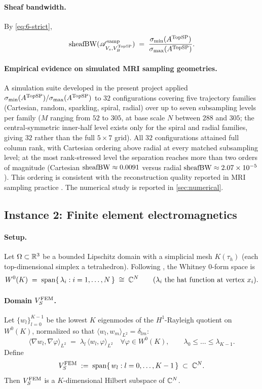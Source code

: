 \paragraph{Sheaf bandwidth.}
By \cref{eq:6-strict},
\[
  \operatorname{sheafBW}(\mathscr{A}^{\mathrm{samp}}_{V_s, V_B^{\mathrm{TopSP}}})
  \;=\;
  \frac{\sigma_{\min}(A^{\mathrm{TopSP}})}{\sigma_{\max}(A^{\mathrm{TopSP}})}.
\]

\paragraph{Empirical evidence on simulated MRI sampling geometries.}
A simulation suite developed in the present project applied
$\sigma_{\min}(A^{\mathrm{TopSP}})/\sigma_{\max}(A^{\mathrm{TopSP}})$ to $32$
configurations covering five trajectory families (Cartesian, random,
sparkling, spiral, radial) over up to seven subsampling levels per
family ($M$ ranging from $52$ to $305$, at base scale $N$ between
$288$ and $305$; the central-symmetric inner-half level exists only
for the spiral and radial families, giving $32$ rather than the full
$5 \times 7$ grid). All $32$ configurations attained full column rank,
with Cartesian ordering above radial at every matched subsampling
level; at the most rank-stressed level the separation reaches more
than two orders of magnitude (Cartesian $\operatorname{sheafBW} \approx 0.0091$
versus radial $\operatorname{sheafBW} \approx 2.07 \times 10^{-5}$). This ordering is
consistent with the reconstruction quality reported in MRI sampling
practice \cite{LustigDonohoPauly2007,LazarusEtAl2019Sparkling}. The
numerical study is reported in \cref{sec:numerical}.

\subsection{Instance 2: Finite element electromagnetics}\label{subsec:6-femem}

\paragraph{Setup.}
Let $\Omega \subset \mathbb{R}^3$ be a bounded Lipschitz domain with a
simplicial mesh $K(\tau_h)$ (each top-dimensional simplex a
tetrahedron). Following \cite{Whitney1957,Bossavit1988}, the Whitney
$0$-form space is
\[
  W^0(K)
  \;=\;
  \operatorname{span}\{\, \lambda_i : i = 1, \dots, N \,\}
  \;\cong\; \mathbb{C}^N
  \qquad
  (\lambda_i \text{ the hat function at vertex } x_i).
\]

\paragraph{Domain $V_S^{\mathrm{FEM}}$.}
Let $\{w_l\}_{l=0}^{K-1}$ be the lowest $K$ eigenmodes of the
$H^1$-Rayleigh quotient on $W^0(K)$, normalized so that
$\langle w_l, w_m \rangle_{L^2} = \delta_{lm}$:
\[
  \langle \nabla w_l, \nabla \varphi \rangle_{L^2}
  \;=\;
  \lambda_l \, \langle w_l, \varphi \rangle_{L^2}
  \quad \forall \varphi \in W^0(K),
  \qquad
  \lambda_0 \le \dots \le \lambda_{K-1}.
\]
Define
\[
  V_S^{\mathrm{FEM}}
  \;:=\;
  \operatorname{span}\{\, w_l : l = 0, \dots, K-1 \,\}
  \;\subset\; \mathbb{C}^N.
\]
Then $V_S^{\mathrm{FEM}}$ is a $K$-dimensional Hilbert subspace of $\mathbb{C}^N$.

